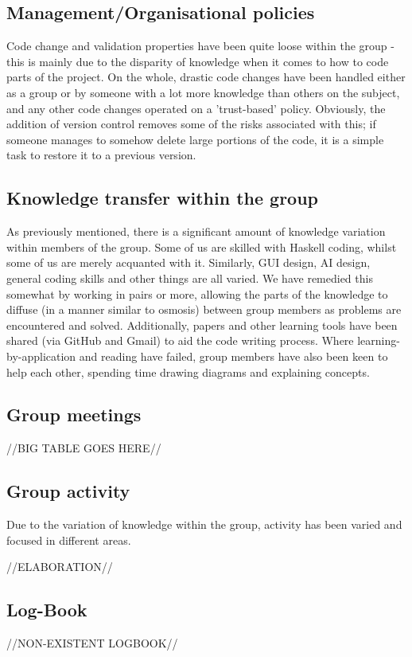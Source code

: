 \documentclass[12pt]{article}
\begin{document}
\subsection{Management/Organisational policies}
Code change and validation properties have been quite loose within the group - this is mainly due to the disparity of knowledge when it comes to how to code parts of the project. On the whole, drastic code changes have been handled either as a group or by someone with a lot more knowledge than others on the subject, and any other code changes operated on a 'trust-based' policy. Obviously, the addition of version control removes some of the risks associated with this; if someone manages to somehow delete large portions of the code, it is a simple task to restore it to a previous version.

\subsection{Knowledge transfer within the group}
As previously mentioned, there is a significant amount of knowledge variation within members of the group. Some of us are skilled with Haskell coding, whilst some of us are merely acquanted with it. Similarly, GUI design, AI design, general coding skills and other things are all varied. We have remedied this somewhat by working in pairs or more, allowing the parts of the knowledge to diffuse (in a manner similar to osmosis) between group members as problems are encountered and solved. Additionally, papers and other learning tools have been shared (via GitHub and Gmail) to aid the code writing process. Where learning-by-application and reading have failed, group members have also been keen to help each other, spending time drawing diagrams and explaining concepts.

\subsection{Group meetings}
//BIG TABLE GOES HERE//

\subsection{Group activity}
Due to the variation of knowledge within the group, activity has been varied and focused in different areas. 

//ELABORATION//

\subsection{Log-Book}
//NON-EXISTENT LOGBOOK//
\end{document}
